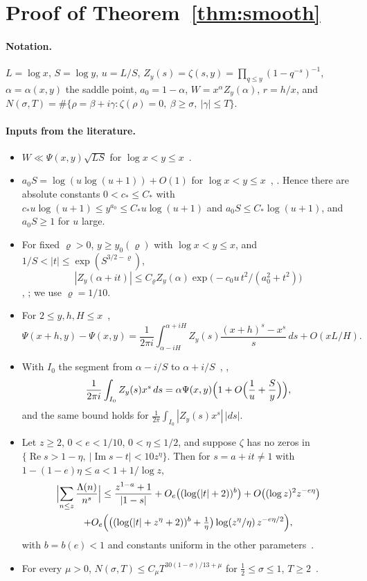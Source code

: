 \section{Proof of Theorem~\ref{thm:smooth}}\label{app:smooth}

\paragraph{Notation.}
$L=\log x$, $S=\log y$, $u=L/S$, $Z_y(s)=\zeta(s,y)=\prod_{q\le y}(1-q^{-s})^{-1}$, $\alpha=\alpha(x,y)$ the
saddle point, $a_0=1-\alpha$, $W=x^\alpha Z_y(\alpha)$, $r=h/x$, and
$N(\sigma,T)=\#\{\rho=\beta+i\gamma:\zeta(\rho)=0,\ \beta\ge\sigma,\ |\gamma|\le T\}$.

\paragraph{Inputs from the literature.}
\begin{itemize}
\item[(I1)] $W\ll\Psi(x,y)\sqrt{LS}$ for $\log x<y\le x$~\cite[(1.3)]{You24}.
\item[(I2)] $a_0S=\log(u\log(u+1))+O(1)$ for $\log x<y\le x$~\cite[Lemma~2]{HT86}, \cite[(1.5)]{You24}. Hence
  there are absolute constants $0<c_*\le C_*$ with $c_*u\log(u+1)\le y^{a_0}\le C_*u\log(u+1)$ and
  $a_0S\le C_*\log(u+1)$, and $a_0S\ge1$ for $u$ large.
\item[(I3)] For fixed $\varrho>0$, $y\ge y_0(\varrho)$ with $\log x<y\le x$, and $1/S<|t|\le\exp(S^{3/2-\varrho})$,
  \[
  |Z_y(\alpha+it)|\le C_\varrho Z_y(\alpha)\exp\bigl(-c_0u\,t^2/(a_0^2+t^2)\bigr)
  \]
  \cite[Lemma~8]{HT86}, \cite[(1.6)]{You24}; we use $\varrho=1/10$.
\item[(I4)] For $2\le y,h,H\le x$~\cite[(1.9)]{You24},
  \[
  \Psi(x+h,y)-\Psi(x,y)=\frac1{2\pi i}\int_{\alpha-iH}^{\alpha+iH}Z_y(s)\frac{(x+h)^s-x^s}{s}\,ds+O(xL/H).
  \]
\item[(I5)] With $I_0$ the segment from $\alpha-i/S$ to $\alpha+i/S$~\cite[Lemma~12]{HT86},
  \cite[Lemma~3.6]{You24},
  \[
  \frac1{2\pi i}\int_{I_0}Z_y(s)x^s\,ds=\alpha\Psi(x,y)\Bigl(1+O\Bigl(\frac1u+\frac Sy\Bigr)\Bigr),
  \]
  and the same bound holds for $\frac1{2\pi}\int_{I_0}|Z_y(s)x^s|\,|ds|$.
\item[(I6)] Let $z\ge2$, $0<e<1/10$, $0<\eta\le1/2$, and suppose $\zeta$ has no zeros in
  $\{\operatorname{Re}s>1-\eta,\ |\operatorname{Im}s-t|<10z^\eta\}$. Then for $s=a+it\neq1$ with
  $1-(1-e)\eta\le a<1+1/\log z$,
  \begin{multline*}
  \Bigl|\sum_{n\le z}\frac{\Lambda(n)}{n^s}\Bigr|\le\frac{z^{1-a}+1}{|1-s|}+O_e\bigl((\log(|t|+2))^b\bigr)
  +O\bigl((\log z)^2z^{-e\eta}\bigr)\\
  +O_e\Bigl(\bigl((\log(|t|+z^\eta+2))^b+\tfrac1\eta\bigr)\log(z^\eta/\eta)\,z^{-e\eta/2}\Bigr),
  \end{multline*}
  with $b=b(e)<1$ and constants uniform in the other parameters~\cite[Lemma~2.3]{You24}.
\item[(I7)] For every $\mu>0$, $N(\sigma,T)\le C_\mu T^{30(1-\sigma)/13+\mu}$ for $\tfrac12\le\sigma\le1$,
  $T\ge2$~\cite[(1.4)]{GM24}.
\end{itemize}

